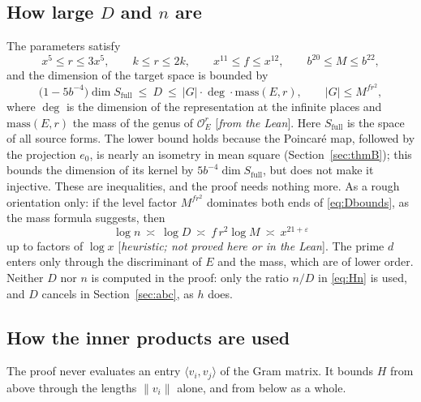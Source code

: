 \documentclass[11pt]{amsart}
\numberwithin{equation}{section}
\theoremstyle{definition}
\theoremstyle{remark}
\newcommand{\cO}{\mathcal O}
\newcommand{\status}[1]{\textup{[\emph{#1}]}}
\begin{document}
\subsection*{How large $D$ and $n$ are}
The parameters satisfy
\begin{equation}\label{eq:paramsizes}
 x^5\le r\le3x^5,\qquad k\le r\le2k,\qquad x^{11}\le f\le x^{12},\qquad b^{20}\le M\le b^{22},
\end{equation}
and the dimension of the target space is bounded by
\begin{equation}\label{eq:Dbounds}
 \bigl(1-5b^{-4}\bigr)\dim S_{\mathrm{full}}\ \le\ D\ \le\ |G|\cdot\deg\cdot\mathrm{mass}(E,r),\qquad |G|\le M^{fr^2},
\end{equation}
where $\deg$ is the dimension of the representation at the infinite places and $\mathrm{mass}(E,r)$ the mass of the genus of $\cO_E^r$ \status{from the Lean}. Here $S_{\mathrm{full}}$ is the space of all source forms. The lower bound holds because the Poincar\'e map, followed by the projection $e_0$, is nearly an isometry in mean square (Section~\ref{sec:thmB}); this bounds the dimension of its kernel by $5b^{-4}\dim S_{\mathrm{full}}$, but does not make it injective. These are inequalities, and the proof needs nothing more. As a rough orientation only: if the level factor $M^{fr^2}$ dominates both ends of \eqref{eq:Dbounds}, as the mass formula suggests, then
\begin{equation}\label{eq:nsize}
 \log n\ \asymp\ \log D\ \asymp\ f\,r^2\log M\ \asymp\ x^{21+\varepsilon}
\end{equation}
up to factors of $\log x$ \status{heuristic; not proved here or in the Lean}. The prime $d$ enters only through the discriminant of $E$ and the mass, which are of lower order. Neither $D$ nor $n$ is computed in the proof: only the ratio $n/D$ in \eqref{eq:Hn} is used, and $D$ cancels in Section~\ref{sec:abc}, as $h$ does.

\subsection*{How the inner products are used}
The proof never evaluates an entry $\langle v_i,v_j\rangle$ of the Gram matrix. It bounds $H$ from above through the lengths $\|v_i\|$ alone, and from below as a whole.
\end{document}
